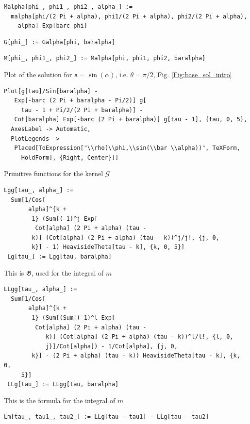 \documentclass[reqno]{amsart}
\theoremstyle{definition} \newtheorem{definition}{Definition}[section]
\theoremstyle{definition} \newtheorem{remark}[definition]{Remark}
\theoremstyle{plain} \newtheorem{lemma}[definition]{Lemma}
\theoremstyle{plain} \newtheorem{proposition}[definition]{Proposition}
\theoremstyle{plain} \newtheorem{theorem}[definition]{Theorem}
\theoremstyle{plain} \newtheorem{corollary}[definition]{Corollary}
\theoremstyle{definition} \newtheorem{example}[definition]{Example}
\theoremstyle{plain} \newtheorem{claim}[clai]{Claim}
\theoremstyle{definition} \newtheorem{assumption}[definition]{Assumption}
\theoremstyle{definition} \newtheorem{observation}[definition]{Observation}
\newcommand{\1}{\mathbbm 1}
\numberwithin{equation}{section} %
\theoremstyle{plain} \newtheorem*{theorem*}{Theorem}
\theoremstyle{plain} \newtheorem{mthm}[maintheorem]{Main Theorem}
\theoremstyle{plain} \newtheorem*{mthm*}{Main Theorem}
\theoremstyle{plain} \newtheorem*{conjecture*}{Conjecture}
\theoremstyle{plain} \newtheorem{conjecture}[definition]{Conjecture}
\theoremstyle{plain} \newtheorem*{problem*}{Problem}
\begin{document}
\begin{verbatim}
Malpha[phi_, phi1_, phi2_, alpha_] := 
  malpha[phi/(2 Pi + alpha), phi1/(2 Pi + alpha), phi2/(2 Pi + alpha), 
    alpha] Exp[barc phi]
\end{verbatim}
\begin{verbatim}
G[phi_] := Galpha[phi, baralpha]
\end{verbatim}
\begin{verbatim}
M[phi_, phi1_, phi2_] := Malpha[phi, phi1, phi2, baralpha]
\end{verbatim}
\medskip
Plot of the solution for $\mathtt a = \sin(\bar \alpha)$, i.e. $\theta = \pi/2$, Fig. \ref{Fig:base_sol_intro}
\medskip
\begin{verbatim}
Plot[g[tau]/Sin[baralpha] - 
   Exp[-barc (2 Pi + baralpha - Pi/2)] g[
     tau - 1 + Pi/2/(2 Pi + baralpha)] - 
   Cot[baralpha] Exp[-barc (2 Pi + baralpha)] g[tau - 1], {tau, 0, 5}, 
  AxesLabel -> Automatic, 
  PlotLegends -> 
   Placed[ToExpression["\\rho(\\phi,\\sin(\\bar \\alpha))", TeXForm, 
     HoldForm], {Right, Center}]]
\end{verbatim}

\bigskip


\bigskip

\noindent Primitive functions for the kernel $\mathcal G$
\medskip
\begin{verbatim}
Lgg[tau_, alpha_] := 
  Sum[1/Cos[
       alpha]^{k + 
        1} (Sum[(-1)^j Exp[
         Cot[alpha] (2 Pi + alpha) (tau - 
        k)] (Cot[alpha] (2 Pi + alpha) (tau - k))^j/j!, {j, 0, 
        k}] - 1) HeavisideTheta[tau - k], {k, 0, 5}]
 Lg[tau_] := Lgg[tau, baralpha]
\end{verbatim}
\medskip
This is $\mathfrak G$, used for the integral of $m$
\medskip
\begin{verbatim}
LLgg[tau_, alpha_] := 
  Sum[1/Cos[
       alpha]^{k + 
        1} (Sum[(Sum[(-1)^l Exp[
         Cot[alpha] (2 Pi + alpha) (tau - 
            k)] (Cot[alpha] (2 Pi + alpha) (tau - k))^l/l!, {l, 0, 
            j}]/Cot[alpha]) - 1/Cot[alpha], {j, 0, 
        k}] - (2 Pi + alpha) (tau - k)) HeavisideTheta[tau - k], {k, 0,
     5}]
 LLg[tau_] := LLgg[tau, baralpha]
\end{verbatim}
\medskip
This is the formula for the integral of $m$
\medskip
\begin{verbatim}
Lm[tau_, tau1_, tau2_] := LLg[tau - tau1] - LLg[tau - tau2]
\end{verbatim}
\end{document}

